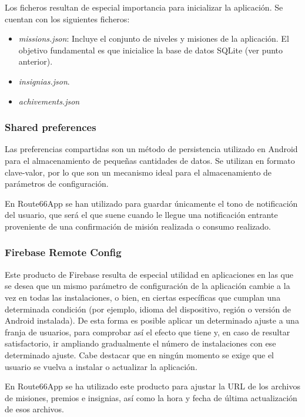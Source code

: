 \documentclass[twoside]{report}
\begin{document}
Los ficheros resultan de especial importancia para inicializar la aplicación. Se cuentan con los siguientes ficheros:

\begin{itemize}
\item \textit{missions.json}: Incluye el conjunto de niveles y misiones de la aplicación. El objetivo fundamental es que inicialice la base de datos SQLite (ver punto anterior).

\item \textit{insignias.json}.

\item \textit{achivements.json}
\end{itemize}

\subsubsection{Shared preferences}

Las preferencias compartidas son un método de persistencia utilizado en Android para el almacenamiento de pequeñas cantidades de datos. Se utilizan en formato clave-valor, por lo que son un mecanismo ideal para el almacenamiento de parámetros de configuración.

En Route66App se han utilizado para guardar únicamente el tono de notificación del usuario, que será el que suene cuando le llegue una notificación entrante proveniente de una confirmación de misión realizada o consumo realizado.

\subsubsection{Firebase Remote Config}

Este producto de Firebase resulta de especial utilidad en aplicaciones en las que se desea que un mismo parámetro de configuración de la aplicación cambie a la vez en todas las instalaciones, o bien, en ciertas específicas que cumplan una determinada condición (por ejemplo, idioma del dispositivo, región o versión de Android instalada). De esta forma es posible aplicar un determinado ajuste a una franja de usuarios, para comprobar así el efecto que tiene y, en caso de resultar satisfactorio, ir ampliando gradualmente el número de instalaciones con ese determinado ajuste. Cabe destacar que en ningún momento se exige que el usuario se vuelva a instalar o actualizar la aplicación.

En Route66App se ha utilizado este producto para ajustar la URL de los archivos de misiones, premios e insignias, así como la hora y fecha de última actualización de esos archivos.
\end{document}
